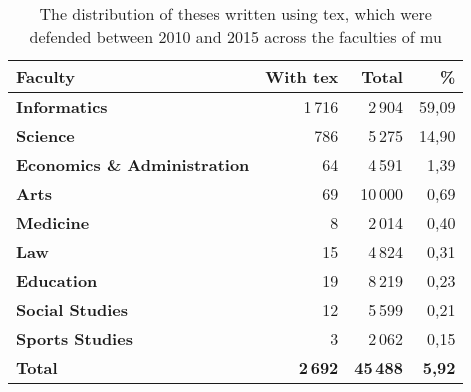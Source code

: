   \begin{table}
    \begin{tabularx}{\textwidth}{Xrrr}
      \textbf{Faculty} & \textbf{With \gls{tex}} & \textbf{Total} & \textbf{\%} \\
      \hline
      \textbf{Informatics}                 & 1\,716 &  2\,904 & 59,09 \\%
      \textbf{Science}                     & 786    &  5\,275 & 14,90 \\%
      \textbf{Economics \& Administration} & 64     &  4\,591 &  1,39 \\%
      \textbf{Arts}                        & 69     & 10\,000 &  0,69 \\%
      \textbf{Medicine}                    & 8      &  2\,014 &  0,40 \\%
      \textbf{Law}                         & 15     &  4\,824 &  0,31 \\%
      \textbf{Education}                   & 19     &  8\,219 &  0,23 \\%
      \textbf{Social Studies}              & 12     &  5\,599 &  0,21 \\%
      \textbf{Sports Studies}              & 3      &  2\,062 &  0,15 \\%
      \hline
      \textbf{Total} & \textbf{2\,692} & \textbf{45\,488} & \textbf{5,92}
    \end{tabularx}
    \caption{The distribution of theses written using \gls{tex}, which were defended between 2010 and 2015 across the faculties of \gls{mu}}
    \label{table:statistics-tex}
  \end{table}
  
